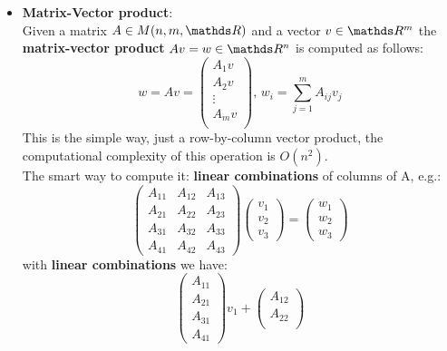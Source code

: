 \documentclass[computationalMathematics.tex]{subfiles}
\begin{document}
\begin{itemize}
     \item \textbf{Matrix-Vector product}:\\
        Given a matrix $A \in M(n, m, \R)$ and a vector $v \in \R^m$ the \textbf{matrix-vector product} $A v = w \in \R^n$ is computed as follows:
        \[
          w = Av = \begin{pmatrix}
          A_1 v\\
          A_2 v\\
          \vdots\\
          A_m v\\
          \end{pmatrix}, \, 
          w_i = \sum\limits_{j=1}^m A_{ij} v_j
        \]
        This is the simple way, just a row-by-column vector product, the computational complexity of this operation is $O(n^2)$.\\
        The smart way to compute it: \textbf{linear combinations} of columns of A, e.g.:
        \[
            \begin{pmatrix}
                      A_{11} & A_{12} & A_{13}\\
                      A_{21} & A_{22} & A_{23}\\
                      A_{31} & A_{32} & A_{33}\\
                      A_{41} & A_{42} & A_{43}
            \end{pmatrix}
            \begin{pmatrix}
                      v_1\\
                      v_2\\
                      v_3
            \end{pmatrix} =
            \begin{pmatrix}
                      w_1\\
                      w_2\\
                      w_3
            \end{pmatrix}
          \]
        with \textbf{linear combinations} we have:
        \[
        \begin{pmatrix}
                A_{11}\\
                A_{21}\\
                A_{31}\\
                A_{41}
        \end{pmatrix}v_1 +
        \begin{pmatrix}
                A_{12}\\
                A_{22}\\

\end{pmatrix}\]
\end{itemize}
\end{document}

